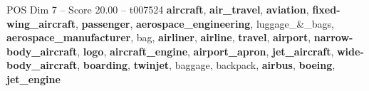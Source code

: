 \begin{textsample}{POS Dim 7 – Score 20.00 – t007524}  \label{ex:f7_pos_019}
\textbf{aircraft}, \textbf{air\_travel}, \textbf{aviation}, \textbf{fixed-wing\_aircraft}, \textbf{passenger}, \textbf{aerospace\_engineering}, luggage\_\&\_bags, \textbf{aerospace\_manufacturer}, bag, \textbf{airliner}, \textbf{airline}, \textbf{travel}, \textbf{airport}, \textbf{narrow-body\_aircraft}, \textbf{logo}, \textbf{aircraft\_engine}, \textbf{airport\_apron}, \textbf{jet\_aircraft}, \textbf{wide-body\_aircraft}, \textbf{boarding}, \textbf{twinjet}, baggage, backpack, \textbf{airbus}, \textbf{boeing}, \textbf{jet\_engine}

\end{textsample}
